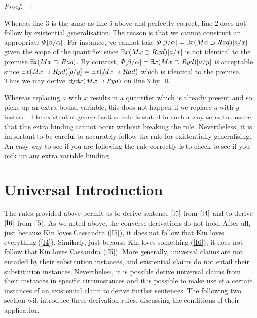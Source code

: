 \begin{proof}
	 \pr{}
   
	 
\end{proof}

Whereas line $3$ is the same as line $6$ above and perfectly correct, line $2$ does not follow by existential generalisation.
The reason is that we cannot construct an appropriate $\varPhi[\beta/\alpha]$.
For instance, we cannot take $\varPhi[\beta/\alpha]=\exists x(Mx \supset Rxd)[a/x]$ given the scope of the quantifier since $\exists x(Mx \supset Rxd)[a/x]$ is not identical to the premise $\exists x(Mx \supset Rad)$.
By contrast, $\varPhi[\beta/\alpha]=\exists x(Mx \supset Ryd)[a/y]$ is acceptable since $\exists x(Mx \supset Ryd)[a/y]=\exists x(Mx \supset Rad)$ which is identical to the premise.
Thus we may derive $\exists y\exists x(Mx \supset Ryd)$ on line $3$ by $\exists$I.

Whereas replacing $a$ with $x$ results in a quantifier which is already present and so picks up an extra bound variable, this does not happen if we replace $a$ with $y$ instead. 
The existential generalisation rule is stated in such a way so as to ensure that this extra binding cannot occur without breaking the rule.
Nevertheless, it is important to be careful to accurately follow the rule for existentially generalising.
An easy way to see if you are following the rule correctly is to check to see if you pick up any extra variable binding.




\section{Universal Introduction}
  \label{sec:UniIntro}

The rules provided above permit us to derive sentence $\ref{I5}$ from $\ref{I4}$ and to derive $\ref{I6}$ from $\ref{I5}$.
As we noted above, the converse derivations do not hold.
After all, just because Kin loves Cassandra (\ref{I5}), it does not follow that Kin loves everything (\ref{I4}).
Similarly, just because Kin loves something (\ref{I6}), it does not follow that Kin loves Cassandra (\ref{I5}).
More generally, universal claims are not entailed by their substitution instances, and existential claims do not entail their substitution instances.
Nevertheless, it is possible derive universal claims from their instances in specific circumstances and it is possible to make use of a certain instances of an existential claim to derive further sentences.
The following two section will introduce these derivation rules, discussing the conditions of their application.

